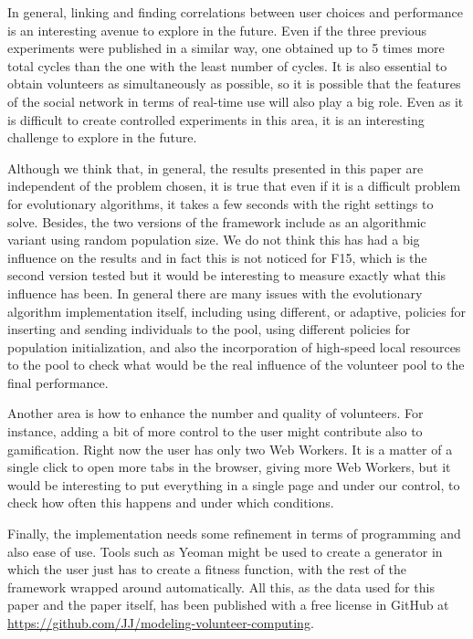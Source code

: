 \documentclass[letterpaper]{article}
\begin{document}
In general, linking and finding correlations between user choices and
performance is an interesting avenue to explore in the future. Even if
the three previous experiments were published in a similar way, one
obtained up to 5 times more total cycles  than the one with the least
number of cycles. It is also essential to obtain volunteers as
simultaneously as possible, so it is possible that the features of the
social network in terms of real-time use will also play a big
role. Even as it is difficult to create controlled experiments in this
area, it is an interesting challenge to explore in the future.

Although we think that, in general, the results presented in this
paper are independent of the problem chosen, it is true that even if
it is a difficult problem for evolutionary algorithms, it takes a few
seconds with the right settings to solve. 
Besides, the two versions of the framework include as an
algorithmic variant using random population size. We do not think this
has had a big influence on the results and in fact this is not noticed
for F15, which is the second version tested but it would be interesting to
measure exactly what this influence has been. In general there are
many issues with the evolutionary algorithm implementation itself,
including using different, or adaptive, policies for inserting and
sending individuals to the pool,
using different policies for population initialization, and also the
incorporation of high-speed local resources to the pool to check what
would be the real influence of the volunteer pool to the final
performance. 

Another area is how to enhance the number and quality of
volunteers. For instance, adding a bit of more
control to the user might contribute also to gamification. Right now
the user has only two Web Workers. It is a matter of a single click to
open more tabs in the browser, giving more Web Workers, but it would be
interesting to put everything in a single page and under our control,
to check how often this happens and under which conditions. 

Finally, the implementation needs some refinement in terms of
programming and also ease of use. Tools such as Yeoman might be used %
to create a generator in which the user just has to create a fitness
function, with the rest of the framework wrapped around
automatically. All this, as the data used for this paper and the paper
itself, has been published with a free license in GitHub at
\url{https://github.com/JJ/modeling-volunteer-computing}.  
\end{document}
